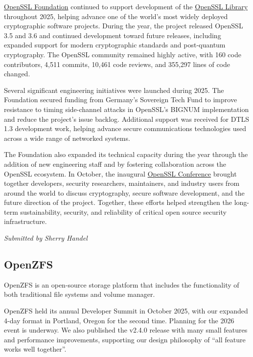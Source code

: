 \documentclass[a4paper]{report}
\begin{document}
\href{https://openssl.foundation/}{OpenSSL Foundation} continued to support development of the \href{https://openssl-library.org/}{OpenSSL Library} throughout 2025, helping advance one of the world's most widely deployed cryptographic software projects. During the year, the project released OpenSSL 3.5 and 3.6 and continued development toward future releases, including expanded support for modern cryptographic standards and post-quantum cryptography. The OpenSSL community remained highly active, with 160 code contributors, 4,511 commits, 10,461 code reviews, and 355,297 lines of code changed.

Several significant engineering initiatives were launched during 2025. The Foundation secured funding from Germany's Sovereign Tech Fund to improve resistance to timing side-channel attacks in OpenSSL's BIGNUM implementation and reduce the project's issue backlog. Additional support was received for DTLS 1.3 development work, helping advance secure communications technologies used across a wide range of networked systems.

The Foundation also expanded its technical capacity during the year through the addition of new engineering staff and by fostering collaboration across the OpenSSL ecosystem. In October, the inaugural \href{https://2025.openssl-conference.org/}{OpenSSL Conference} brought together developers, security researchers, maintainers, and industry users from around the world to discuss cryptography, secure software development, and the future direction of the project. Together, these efforts helped strengthen the long-term sustainability, security, and reliability of critical open source security infrastructure.

{\em Submitted by Sherry Handel}

\subsection{OpenZFS}

OpenZFS is an open-source storage platform that includes the functionality of both traditional file systems and volume manager.

OpenZFS held its annual Developer Summit in October 2025, with our expanded 4-day format in Portland, Oregon for the second time. Planning for the 2026 event is underway. We also published the v2.4.0 release with many small features and performance improvements, supporting our design philosophy of ``all feature works well together''.
\end{document}
